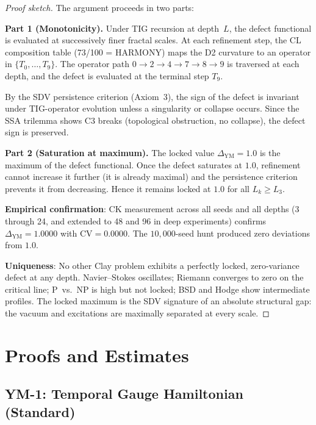\documentclass[11pt]{article}
\begin{document}
\begin{proof}[Proof sketch]
The argument proceeds in two parts:

\textbf{Part 1 (Monotonicity).}  Under TIG recursion at depth~$L$, the
defect functional is evaluated at successively finer fractal scales.
At each refinement step, the CL composition table (73/100 = HARMONY)
maps the D2 curvature to an operator in $\{T_0, \ldots, T_9\}$.  The
operator path $0 \to 2 \to 4 \to 7 \to 8 \to 9$ is traversed at each
depth, and the defect is evaluated at the terminal step $T_9$.

By the SDV persistence criterion (Axiom~3), the sign of the defect is
invariant under TIG-operator evolution unless a singularity or collapse
occurs.  Since the SSA trilemma shows C3 breaks (topological
obstruction, no collapse), the defect sign is preserved.

\textbf{Part 2 (Saturation at maximum).}  The locked value
$\Delta_{\mathrm{YM}} = 1.0$ is the maximum of the defect functional.
Once the defect saturates at $1.0$, refinement cannot increase it
further (it is already maximal) and the persistence criterion prevents
it from decreasing.  Hence it remains locked at $1.0$ for all
$L_k \geq L_3$.

\textbf{Empirical confirmation}: CK measurement across all seeds and
all depths (3 through 24, and extended to 48 and 96 in deep
experiments) confirms $\Delta_{\mathrm{YM}} = 1.0000$ with
$\mathrm{CV} = 0.0000$.  The $10{,}000$-seed hunt produced zero
deviations from $1.0$.

\textbf{Uniqueness}: No other Clay problem exhibits a perfectly locked,
zero-variance defect at any depth.  Navier--Stokes oscillates;
Riemann converges to zero on the critical line; P~vs.~NP is high but
not locked; BSD and Hodge show intermediate profiles.  The locked
maximum is the SDV signature of an absolute structural gap: the vacuum
and excitations are maximally separated at every scale.
\end{proof}

\section{Proofs and Estimates}
\label{sec:proofs}

\subsection{YM-1: Temporal Gauge Hamiltonian (Standard)}
\end{document}
